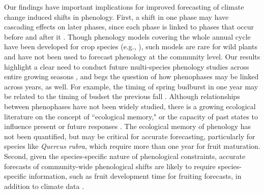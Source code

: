 \documentclass{article}
\begin{document}
\par Our findings have important implications for improved forecasting of climate change induced shifts in phenology. %
First, a shift in one phase may have cascading effects on later phases, since each phase is linked to phases that occur before and after it \citep{wolkovich2014b}. Though phenology models covering the whole annual cycle have been developed for crop species (e.g., ),%
such models are rare for wild plants \citep[but see][]{chuine2001} and have not been used to forecast phenology at the community level. Our results highlight a clear need to conduct future multi-species phenology studies across entire growing seasons \citep{wolkovich2014}, and begs the question of how phenophases may be linked across years, as well.  For example, the timing of spring budburst in one year may be related to the timing of budset the previous fall \citep {mimura2010}. Although relationships between phenophases have not been widely studied, there is a growing ecological literature on the concept of ``ecological memory," or the capacity of past states to influence present or future responses \citep {ogle2015}. The ecological memory of phenology has not been quantified, but may be critical for accurate forecasting, particularly for species like \emph{Quercus rubra}, which require more than one year for fruit maturation. Second, given the species-specific nature of phenological constraints, accurate forecasts of community-wide phenological shifts are likely to require species-specific information, such as fruit development time for fruiting forecasts, in addition to climate data \citep{diez2012}.
\end{document}
